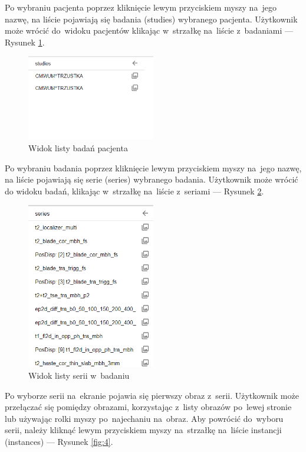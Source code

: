\documentclass[a4paper,11pt,twoside,openright]{report}
\theoremstyle{definition}
\begin{document}
Po wybraniu pacjenta poprzez kliknięcie lewym przyciskiem myszy na~jego nazwę,
na liście pojawiają się badania (studies) wybranego pacjenta. Użytkownik może
wrócić do~widoku pacjentów klikając w~strzałkę na~liście z~badaniami --- Rysunek \ref{fig:2}.

\begin{figure}[h!]
	\center
	\includegraphics[width=0.5\textwidth]{2}
	\caption{Widok listy badań pacjenta}
    	\label{fig:2}
\end{figure}

\pagebreak

Po wybraniu badania poprzez kliknięcie lewym przyciskiem myszy na~jego nazwę,
na liście pojawiają się serie (series) wybranego badania. Użytkownik może wrócić
do widoku badań, klikając w~strzałkę na~liście z~seriami --- Rysunek \ref{fig:3}.

\begin{figure}[h!]
	\center
	\includegraphics[width=0.5\textwidth]{3}
	\caption{Widok listy serii w~badaniu}
    	\label{fig:3}
\end{figure}

Po wyborze serii na~ekranie pojawia się pierwszy obraz z~serii. Użytkownik
może przełączać się pomiędzy obrazami, korzystając z~listy obrazów po~lewej
stronie lub używając rolki myszy po~najechaniu na~obraz. Aby powrócić do~wyboru
serii, należy kliknąć lewym przyciskiem myszy na~strzałkę na~liście instancji
(instances) --- Rysunek \ref{fig:4}.
\end{document}

